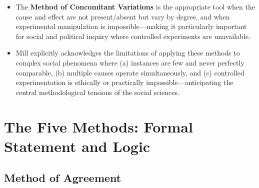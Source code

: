 \documentclass[12pt]{article}
\begin{document}
\begin{itemize}[leftmargin=*, itemsep=4pt]
    \item The \textbf{Method of Concomitant Variations} is the appropriate tool when the cause and effect are not present/absent but vary by degree, and when experimental manipulation is impossible---making it particularly important for social and political inquiry where controlled experiments are unavailable.
    \item Mill explicitly acknowledges the limitations of applying these methods to complex social phenomena where (a) instances are few and never perfectly comparable, (b) multiple causes operate simultaneously, and (c) controlled experimentation is ethically or practically impossible---anticipating the central methodological tensions of the social sciences.
\end{itemize}

\section{The Five Methods: Formal Statement and Logic}

\subsection{Method of Agreement}
\end{document}
